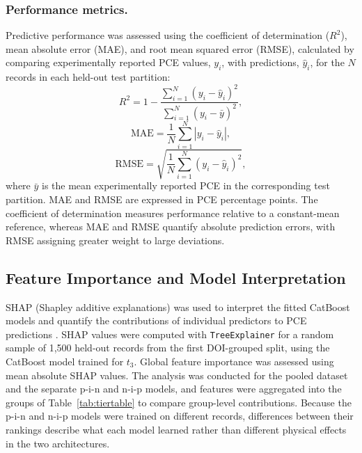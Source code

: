 \documentclass[3p]{elsarticle}
\begin{document}
\subsubsection{Performance metrics.}
Predictive performance was assessed using the coefficient of determination ($R^2$), mean absolute error (MAE), and root mean squared error (RMSE), calculated by comparing experimentally reported PCE values, $y_i$, with predictions, $\hat{y}_i$, for the $N$ records in each held-out test partition:
\begin{equation}
R^2 =
1-\frac{\sum_{i=1}^{N}(y_i-\hat{y}_i)^2}
{\sum_{i=1}^{N}(y_i-\bar{y})^2},
\end{equation}
\begin{equation}
\mathrm{MAE} =
\frac{1}{N}\sum_{i=1}^{N}|y_i-\hat{y}_i|,
\end{equation}
\begin{equation}
\mathrm{RMSE} =
\sqrt{\frac{1}{N}\sum_{i=1}^{N}(y_i-\hat{y}_i)^2},
\end{equation}
where $\bar{y}$ is the mean experimentally reported PCE in the corresponding test partition. MAE and RMSE are expressed in PCE percentage points. The coefficient of determination measures performance relative to a constant-mean reference, whereas MAE and RMSE quantify absolute prediction errors, with RMSE assigning greater weight to large deviations.

\subsection{Feature Importance and Model Interpretation}

SHAP (Shapley additive explanations) was used to interpret the fitted CatBoost models and quantify the contributions of individual predictors to PCE predictions \cite{shappaper}. SHAP values were computed with \texttt{TreeExplainer} for a random sample of 1,500 held-out records from the first DOI-grouped split, using the CatBoost model trained for $t_3$. Global feature importance was assessed using mean absolute SHAP values. The analysis was conducted for the pooled dataset and the separate p-i-n and n-i-p models, and features were aggregated into the groups of Table~\ref{tab:tiertable} to compare group-level contributions. Because the p-i-n and n-i-p models were trained on different records, differences between their rankings describe what each model learned rather than different physical effects in the two architectures.

\end{document}
